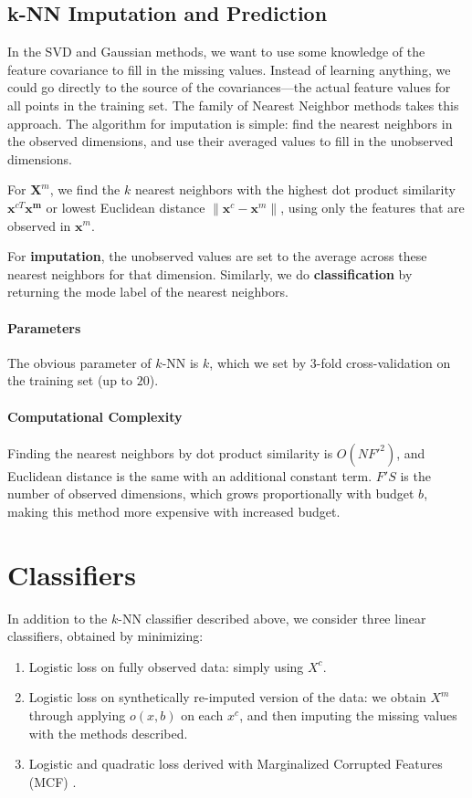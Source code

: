 \subsection{k-NN Imputation and Prediction}
In the SVD and Gaussian methods, we want to use some knowledge of the feature covariance to fill in the missing values.
Instead of learning anything, we could go directly to the source of the covariances---the actual feature values for all points in the training set.
The family of Nearest Neighbor methods takes this approach.
The algorithm for imputation is simple: find the nearest neighbors in the observed dimensions, and use their averaged values to fill in the unobserved dimensions.

For $\mathbf{X}^m$, we find the $k$ nearest neighbors with the highest dot product similarity $\mathbf{x}^{cT} \mathbf{x^m}$ or lowest Euclidean distance $\| \mathbf{x}^{c} - \mathbf{x}^{m} \|$, using only the features that are observed in $\mathbf{x}^{m}$.

For \textbf{imputation}, the unobserved values are set to the average across these nearest neighbors for that dimension.
Similarly, we do \textbf{classification} by returning the mode label of the nearest neighbors.

\paragraph{Parameters}
The obvious parameter of $k$-NN is $k$, which we set by 3-fold cross-validation on the training set (up to $20$).

\paragraph{Computational Complexity}
Finding the nearest neighbors by dot product similarity is $O(NF'^2)$, and Euclidean distance is the same with an additional constant term.
$F'S$ is the number of observed dimensions, which grows proportionally with budget $b$, making this method more expensive with increased budget.

\section{Classifiers}

In addition to the $k$-NN classifier described above, we consider three linear classifiers, obtained by minimizing:
\begin{enumerate}
  \item Logistic loss on fully observed data: simply using $X^c$.
  \item Logistic loss on synthetically re-imputed version of the data: we obtain $X^m$ through applying $o(x, b)$ on each $x^c$, and then imputing the missing values with the methods described.
  \item Logistic and quadratic loss derived with Marginalized Corrupted Features (MCF) \cite{Maaten-ICML-2013}.
\end{enumerate}

